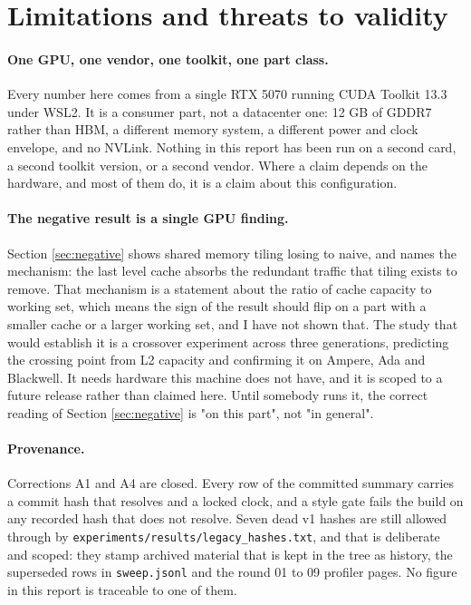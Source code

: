 \section{Limitations and threats to validity}
\label{sec:limitations}

\paragraph{One GPU, one vendor, one toolkit, one part class.} Every number here
comes from a single RTX 5070 running CUDA Toolkit 13.3 under WSL2. It is a
consumer part, not a datacenter one: 12 GB of GDDR7 rather than HBM, a different
memory system, a different power and clock envelope, and no NVLink. Nothing in this
report has been run on a second card, a second toolkit version, or a second vendor.
Where a claim depends on the hardware, and most of them do, it is a claim about
this configuration.

\paragraph{The negative result is a single GPU finding.} Section \ref{sec:negative}
shows shared memory tiling losing to naive, and names the mechanism: the last level
cache absorbs the redundant traffic that tiling exists to remove. That mechanism is
a statement about the ratio of cache capacity to working set, which means the sign
of the result should flip on a part with a smaller cache or a larger working set,
and I have not shown that. The study that would establish it is a crossover
experiment across three generations, predicting the crossing point from L2 capacity
and confirming it on Ampere, Ada and Blackwell. It needs hardware this machine does
not have, and it is scoped to a future release rather than claimed here. Until
somebody runs it, the correct reading of Section \ref{sec:negative} is "on this
part", not "in general".

\paragraph{Provenance.} Corrections A1 and A4 are closed. Every row of the
committed summary carries a commit hash that resolves and a locked clock, and a
style gate fails the build on any recorded hash that does not resolve. Seven dead
v1 hashes are still allowed through by
\texttt{experiments/results/legacy\_hashes.txt}, and that is deliberate and scoped:
they stamp archived material that is kept in the tree as history, the superseded
rows in \texttt{sweep.jsonl} and the round 01 to 09 profiler pages. No figure in
this report is traceable to one of them.

